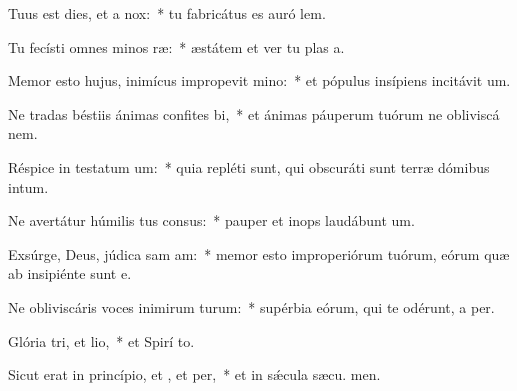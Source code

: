 \item Tuus est dies, et a  nox:~* tu fabricátus es auró  lem.
\item Tu fecísti omnes minos ræ:~* æstátem et ver tu plas a.
\item Memor esto hujus, inimícus impropevit mino:~* et pópulus insípiens incitávit  um.
\item Ne tradas béstiis ánimas confites bi,~* et ánimas páuperum tuórum ne obliviscá  nem.
\item Réspice in testatum um:~* quia repléti sunt, qui obscuráti sunt terræ dómibus intum.
\item Ne avertátur húmilis tus consus:~* pauper et inops laudábunt  um.
\item Exsúrge, Deus, júdica sam am:~* memor esto improperiórum tuórum, eórum quæ ab insipiénte sunt  e.
\item Ne obliviscáris voces inimirum turum:~* supérbia eórum, qui te odérunt, a per.
\item Glória tri, et lio,~* et Spirí to.
\item Sicut erat in princípio, et , et per,~* et in sǽcula sæcu. men.
